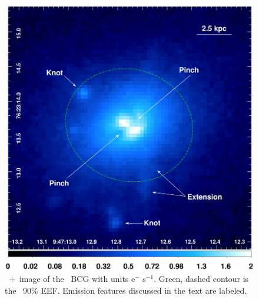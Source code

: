 \begin{figure}
  \begin{center}
    \begin{minipage}{\linewidth}
      \includegraphics*[width=\textwidth, trim=0mm 0mm 0mm 0mm, clip]{arx_rbs797_opt.ps}
    \end{minipage}
    \caption{\hst\ \myi+\myv\ image of the \rbs\ BCG with units e$^-$
      s$^{-1}$. Green, dashed contour is the \cxo\ 90\% EEF. Emission
      features discussed in the text are labeled.}
    \label{fig:hst}
  \end{center}
\end{figure}

